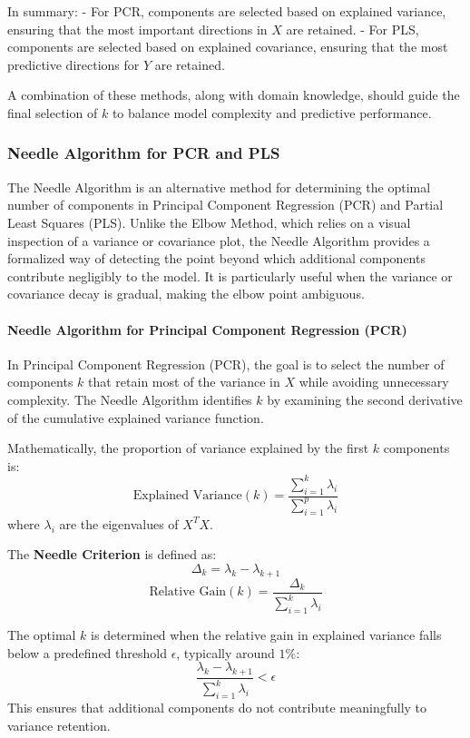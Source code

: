 \documentclass[11pt,twoside,a4paper]{article}
\begin{document}
In summary:
- For PCR, components are selected based on explained variance, ensuring that the most important directions in \( X \) are retained.
- For PLS, components are selected based on explained covariance, ensuring that the most predictive directions for \( Y \) are retained.

A combination of these methods, along with domain knowledge, should guide the final selection of \( k \) to balance model complexity and predictive performance.

\subsubsection{Needle Algorithm for PCR and PLS}
The Needle Algorithm is an alternative method for determining the optimal number of components in Principal Component Regression (PCR) and Partial Least Squares (PLS). Unlike the Elbow Method, which relies on a visual inspection of a variance or covariance plot, the Needle Algorithm provides a formalized way of detecting the point beyond which additional components contribute negligibly to the model. It is particularly useful when the variance or covariance decay is gradual, making the elbow point ambiguous.

\paragraph{Needle Algorithm for Principal Component Regression (PCR)}
In Principal Component Regression (PCR), the goal is to select the number of components \( k \) that retain most of the variance in \( X \) while avoiding unnecessary complexity. The Needle Algorithm identifies \( k \) by examining the second derivative of the cumulative explained variance function.

Mathematically, the proportion of variance explained by the first \( k \) components is:
\[
\text{Explained Variance}(k) = \frac{\sum_{i=1}^{k} \lambda_i}{\sum_{i=1}^{p} \lambda_i}
\]
where \( \lambda_i \) are the eigenvalues of \( X^T X \). 

The \textbf{Needle Criterion} is defined as:
\[
\Delta_k = \lambda_k - \lambda_{k+1}
\]
\[
\text{Relative Gain}(k) = \frac{\Delta_k}{\sum_{i=1}^{k} \lambda_i}
\]

The optimal \( k \) is determined when the relative gain in explained variance falls below a predefined threshold \( \epsilon \), typically around \( 1\% \):
\[
\frac{\lambda_k - \lambda_{k+1}}{\sum_{i=1}^{k} \lambda_i} < \epsilon
\]
This ensures that additional components do not contribute meaningfully to variance retention.
\end{document}
